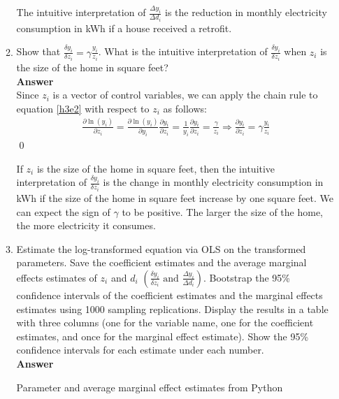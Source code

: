\documentclass{article}
\begin{document}
\begin{enumerate}
\begin{enumerate}
    The intuitive interpretation of $\frac{\Delta y_i}{\Delta d_i}$ is the reduction in monthly electricity consumption in kWh if a house received a retrofit.
    \item Show that $\frac{\delta y_i}{\delta z_i}=\gamma\frac{y_i}{z_i}$. What is the intuitive interpretation of $\frac{\delta y_i}{\delta z_i}$ when $z_i$ is the size of the home in square feet?
    \\\textbf{Answer}\\
    Since $z_i$ is a vector of control variables, we can apply the chain rule to equation \eqref{h3e2} with respect to $z_i$ as follows:
    \begin{align}
        \frac{\partial \ln(y_i)}{\partial z_i}=\frac{\partial \ln(y_i)}{\partial y_i}\frac{\partial y_i}{\partial z_i}=\frac{1}{y_i}\frac{\partial y_i}{\partial z_i}=\frac{\gamma}{z_i}\Rightarrow \frac{\partial y_i}{\partial z_i}=\gamma\frac{y_i}{z_i} \label{h3e8}
    \end{align}\qed

    If $z_i$ is the size of the home in square feet, then the intuitive interpretation of $\frac{\delta y_i}{\delta z_i}$ is the change in monthly electricity consumption in kWh if the size of the home in square feet increase by one square feet. We can expect the sign of $\gamma$ to be positive. The larger the size of the home, the more electricity it consumes.

    \item Estimate the log-transformed equation via OLS on the transformed parameters. Save the coefficient estimates and the average marginal effects estimates of $z_i$ and $d_i$ $\left(\frac{\delta y_i}{\delta z_i}\text{ and }\frac{\Delta y_i}{\Delta d_i}\right)$. Bootstrap the 95\% confidence intervals of the coefficient estimates and the marginal effects estimates using 1000 sampling replications. Display the results in a table with three columns (one for the variable name, one for the coefficient estimates, and once for the marginal effect estimate). Show the 95\% confidence intervals for each estimate under each number.
    \\\textbf{Answer}\\
    \begin{table}[H]\centering
        \begin{threeparttable}
            \caption{Parameter and average marginal effect estimates from Python}
            \label{t1:estimates}
            
        \end{threeparttable}
        \end{table}


\end{enumerate}
\end{enumerate}
\end{document}
